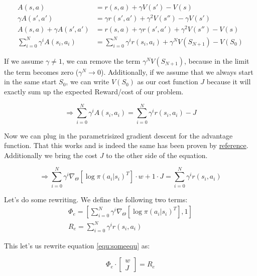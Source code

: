 \begin{align}
	A(s,a) &= r(s,a) + \gamma V(s') - V(s) \\
	\gamma A(s',a') &= \gamma r(s', a') + \gamma^2V(s'') - \gamma V(s') \\
	A(s, a) + \gamma A(s', a') &= r(s,a) + \gamma r(s',a') + \gamma^2 V(s'') - V(s) \\
	\sum_{i = 0}^{N}\gamma^i A(s_i, a_i) &= \sum_{i = 0}^{N}\gamma^i r(s_i, a_i) + \gamma^N V(S_{N+1}) - V(S_0)
\end{align}

\noindent If we assume $\gamma \neq 1$, we can remove the term $\gamma^N V(S_{N+1})$, because in the limit the term becomes zero ($\gamma^N \rightarrow 0$). Additionally, if we assume that we always start in the same start $S_0$, we can write $V(S_0)$ as our cost function $J$ because it will exactly sum up the expected Reward/cost of our problem.

\begin{equation}
	\Rightarrow \sum_{i = 0}^{N}\gamma^i A(s_i, a_i) = \sum_{i = 0}^{N}\gamma^i r(s_i, a_i) - J
\end{equation}

\noindent Now we can plug in the parametrisized gradient descent for the advantage function. That this works and is indeed the same has been proven by \underline{reference}. Additionally we bring the cost $J$ to the other side of the equation.

\begin{equation}
	\label{equ:someequ}
	\Rightarrow \sum_{i = 0}^{N} \gamma^i \nabla_{\Theta} \left[\log \pi(a_i | s_i)^T\right] \cdot w + 1 \cdot J = \sum_{i = 0}^{N}\gamma^i r(s_i, a_i)
\end{equation}

\noindent Let's do some rewriting. We define the following two terms:
\begin{align}
	\Phi_e = \left[  \sum_{i = 0}^{N} \gamma^i \nabla_{\Theta} \left[\log \pi(a_i | s_i)^T\right] , 1 \right]\\
	R_e = \sum_{i = 0}^{N}\gamma^i r(s_i, a_i)
\end{align}

\noindent This let's us rewrite equation \ref{equ:someequ} as:

\begin{equation}
	\Phi_e \cdot \begin{bmatrix} w\\J \end{bmatrix}  = R_e
\end{equation}

